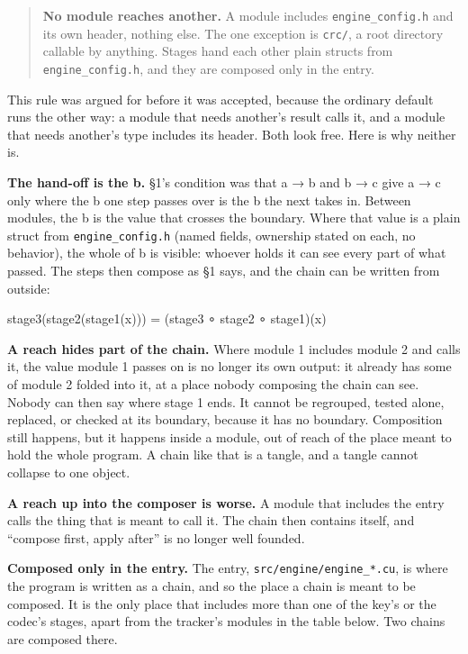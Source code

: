 \begin{quote}
\textbf{No module reaches another.} A module includes \texttt{engine\_\allowbreak{}config.\allowbreak{}h} and its own header, nothing else. The one exception is \texttt{crc/\allowbreak{}}, a root directory callable by anything. Stages hand each other plain structs from \texttt{engine\_\allowbreak{}config.\allowbreak{}h}, and they are composed only in the entry.

\end{quote}

This rule was argued for before it was accepted, because the ordinary default runs the other way: a module that needs another's result calls it, and a module that needs another's type includes its header. Both look free. Here is why neither is.

\textbf{The hand-off is the b.} §1's condition was that a → b and b → c give a → c only where the b one step passes over is the b the next takes in. Between modules, the b is the value that crosses the boundary. Where that value is a plain struct from \texttt{engine\_\allowbreak{}config.\allowbreak{}h} (named fields, ownership stated on each, no behavior), the whole of b is visible: whoever holds it can see every part of what passed. The steps then compose as §1 says, and the chain can be written from outside:

stage3(stage2(stage1(x)))  =  (stage3 ∘ stage2 ∘ stage1)(x)

\textbf{A reach hides part of the chain.} Where module 1 includes module 2 and calls it, the value module 1 passes on is no longer its own output: it already has some of module 2 folded into it, at a place nobody composing the chain can see. Nobody can then say where stage 1 ends. It cannot be regrouped, tested alone, replaced, or checked at its boundary, because it has no boundary. Composition still happens, but it happens inside a module, out of reach of the place meant to hold the whole program. A chain like that is a tangle, and a tangle cannot collapse to one object.

\textbf{A reach up into the composer is worse.} A module that includes the entry calls the thing that is meant to call it. The chain then contains itself, and “compose first, apply after” is no longer well founded.

\textbf{Composed only in the entry.} The entry, \texttt{src/\allowbreak{}engine/\allowbreak{}engine\_\allowbreak{}*.\allowbreak{}cu}, is where the program is written as a chain, and so the place a chain is meant to be composed. It is the only place that includes more than one of the key's or the codec's stages, apart from the tracker's modules in the table below. Two chains are composed there.

